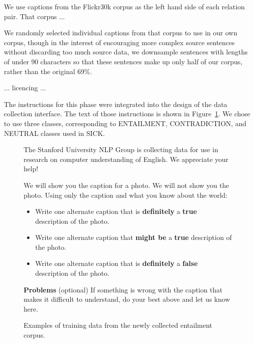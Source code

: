 We use captions from the Flickr30k corpus \cite{hodoshimage} as the left hand side of each relation pair. That corpus ...

We randomly selected individual captions from that corpus to use in our own corpus, though in the interest of encouraging more complex source sentences without discarding too much source data, we downsample sentences with lengths of under 90 characters so that these sentences make up only half of our corpus, rather than the original 69\%.

... licencing ...

The instructions for this phase were integrated into the design of the data collection interface. The text of those instructions is shown in Figure~\ref{instructions-1}. We chose to use three classes, corresponding to ENTAILMENT, CONTRADICTION, and NEUTRAL classes used in SICK.

\begin{figure}
\footnotesize
The Stanford University NLP Group is collecting data for use in research on computer understanding of English. We appreciate your help!

We will show you the caption for a photo. We will not show you the photo. Using only the caption and what you know about the world:
\begin{itemize}
\item Write one alternate caption that is \textbf{definitely} a \textbf{true} description of the photo. 
\item Write one alternate caption that \textbf{might be} a \textbf{true} description of the photo. 
\item Write one alternate caption that is \textbf{definitely} a \textbf{false} description of the photo. 
\end{itemize}
\textbf{Problems} (optional)   If something is wrong with the caption that makes it difficult to understand, do your best above and let us know here.
\caption{\label{instructions-1}Examples of training data from the newly collected entailment corpus.}
\end{figure}


